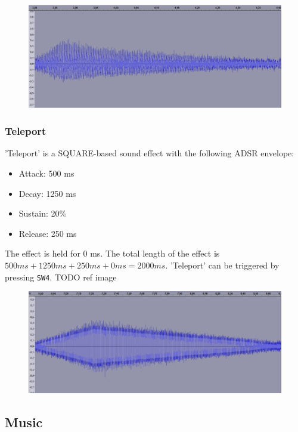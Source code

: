 \begin{figure}[H]
	\includegraphics[width = \textwidth]{images/SW5.png}
	\caption{}
	\label{img-sw5}
\end{figure}

\subsubsection{Teleport}
'Teleport' is a SQUARE-based sound effect with the following ADSR envelope:
\begin{itemize}
	\item{Attack: 500 ms}
	\item{Decay: 1250 ms}
	\item{Sustain: 20\%}
	\item{Release: 250 ms}
\end{itemize}
The effect is held for 0 ms.
The total length of the effect is $500 ms + 1250 ms + 250 ms + 0 ms = 2000 ms$.
'Teleport' can be triggered by pressing \texttt{SW4}.
TODO ref image

\begin{figure}[H]
	\includegraphics[width = \textwidth]{images/SW4.png}
	\caption{}
	\label{img-sw4}
\end{figure}


\subsection{Music}

